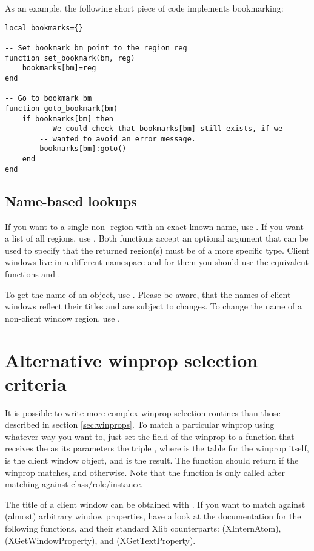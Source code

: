 As an example, the following short piece of code implements 
bookmarking:

\begin{verbatim}
local bookmarks={}

-- Set bookmark bm point to the region reg
function set_bookmark(bm, reg)
    bookmarks[bm]=reg
end

-- Go to bookmark bm
function goto_bookmark(bm)
    if bookmarks[bm] then
        -- We could check that bookmarks[bm] still exists, if we
        -- wanted to avoid an error message.
        bookmarks[bm]:goto()
    end
end
\end{verbatim}

\subsection{Name-based lookups}

If you want to a single non- region with an exact known 
name, use . If you want a list of all regions,
use . Both functions accept an optional argument
that can be used to specify that the returned region(s) must be of a more 
specific type. Client windows live in a different namespace and for them
you should use the equivalent functions 
and .

To get the name of an object, use . Please be
aware, that the names of client windows reflect their titles and
are subject to changes. To change the name of a non-client window
region, use .


\section{Alternative winprop selection criteria}

It is possible to write more complex winprop selection routines than
those described in section \ref{sec:winprops}. To match a particular
winprop using whatever way you want to, just set the 
field of the winprop to a function that receives the as its parameters
the triple , where  is the table for 
the winprop itself,  is the client window object,
and   is the  result.
The function should return  if the winprop matches, 
and  otherwise. Note that the  function
is only called after matching against class/role/instance.

The title of a client window can be obtained with .
If you want to match against (almost) arbitrary window properties,
have a look at the documentation for the following functions, and
their standard Xlib counterparts: 
(XInternAtom),  (XGetWindowProperty),
and  (XGetTextProperty).




